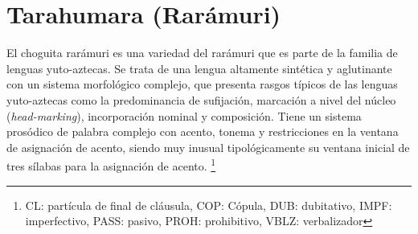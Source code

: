 \section*{Tarahumara (Rarámuri)}

\noindent El choguita rarámuri es una variedad del rarámuri que es parte de la familia de lenguas yuto-aztecas. Se trata de una lengua altamente sintética y aglutinante con un sistema morfológico complejo, que presenta rasgos típicos de las lenguas yuto-aztecas como la predominancia de sufijación, marcación a nivel del núcleo (\textit{head-marking}), incorporación nominal y composición. Tiene un sistema prosódico de palabra complejo con acento, tonema y restricciones en la ventana de asignación de acento, siendo muy inusual tipológicamente su ventana inicial de tres sílabas para la asignación de acento.
\footnote{CL: partícula de final de cláusula, COP: Cópula, DUB: dubitativo, IMPF: imperfectivo, PASS: pasivo, PROH: prohibitivo, VBLZ: verbalizador}
\vspace{0.5cm}

